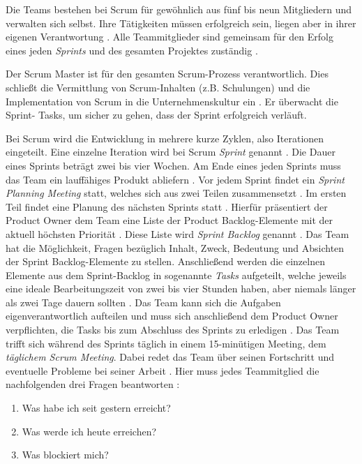Die Teams bestehen bei Scrum für gewöhnlich aus fünf bis neun Mitgliedern und verwalten sich selbst. Ihre Tätigkeiten müssen erfolgreich sein, liegen aber in ihrer eigenen Verantwortung \cite{Pries2011, Wolf2011}. Alle Teammitglieder sind gemeinsam für den Erfolg eines jeden \textit{Sprints} und des gesamten Projektes zuständig \cite{Pichler2010}. \newline

Der Scrum Master ist für den gesamten Scrum-Prozess verantwortlich. Dies schließt die Vermittlung von Scrum-Inhalten (z.B. Schulungen) und die Implementation von Scrum in die Unternehmenskultur ein \cite{Pichler2010}. Er überwacht die Sprint- Tasks, um sicher zu gehen, dass der Sprint erfolgreich verläuft.\newline

Bei Scrum wird die Entwicklung in mehrere kurze Zyklen, also Iterationen eingeteilt. Eine einzelne Iteration wird bei Scrum \textit{Sprint} genannt \cite{Henning2011}. Die Dauer eines Sprints beträgt zwei bis vier Wochen. Am Ende eines jeden Sprints muss das Team ein lauffähiges Produkt abliefern \cite{Wolf2011}. Vor jedem Sprint findet ein \textit{Sprint Planning Meeting} statt, welches sich aus zwei Teilen zusammensetzt \cite{Pichler2010}. Im ersten Teil findet eine Planung des nächsten Sprints statt \cite{Lacey2012}. Hierfür präsentiert der Product Owner dem Team eine Liste der Product Backlog-Elemente mit der aktuell höchsten Priorität \cite{Schwaber2004, Schwaber2007,Pichler2010}. Diese Liste wird \textit{Sprint Backlog} genannt \cite{Wolf2011}. Das Team hat die Möglichkeit, Fragen bezüglich Inhalt, Zweck, Bedeutung und Absichten der Sprint Backlog-Elemente zu stellen. Anschließend werden die einzelnen Elemente aus dem Sprint-Backlog in sogenannte \textit{Tasks} aufgeteilt, welche jeweils eine ideale Bearbeitungszeit von zwei bis vier Stunden haben, aber niemals länger als zwei Tage dauern sollten \cite{Wolf2011}. Das Team kann sich die Aufgaben eigenverantwortlich aufteilen und muss sich anschließend dem Product  Owner verpflichten, die Tasks bis zum Abschluss des Sprints zu erledigen \cite{Wolf2011, Keith2010,Pichler2010}.
Das Team trifft sich während des Sprints täglich in einem 15-minütigen Meeting, dem \textit{täglichem Scrum Meeting}. Dabei redet das Team über seinen Fortschritt und eventuelle Probleme bei seiner Arbeit \cite{Keith2010}. Hier muss jedes Teammitglied die nachfolgenden drei Fragen beantworten \cite{Wolf2011}:
   \begin{enumerate}
      \item Was habe ich seit gestern erreicht?
      \item Was werde ich heute erreichen?
      \item Was blockiert mich?
      \end {enumerate}
      
